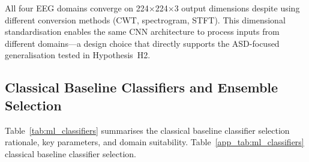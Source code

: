 \noindent All four EEG domains converge on 224$\times$224$\times$3 output dimensions despite using different conversion methods (CWT, spectrogram, STFT). This dimensional standardisation enables the same CNN architecture to process inputs from different domains---a design choice that directly supports the ASD-focused generalisation tested in Hypothesis~H2.




\subsection{Classical Baseline Classifiers and Ensemble Selection}
\label{app:sec4_classifiers}


Table~\ref{tab:ml_classifiers} summarises the classical baseline classifier selection rationale, key parameters, and domain suitability.
\noindent Table~\ref{app_tab:ml_classifiers} classical baseline classifier selection.

